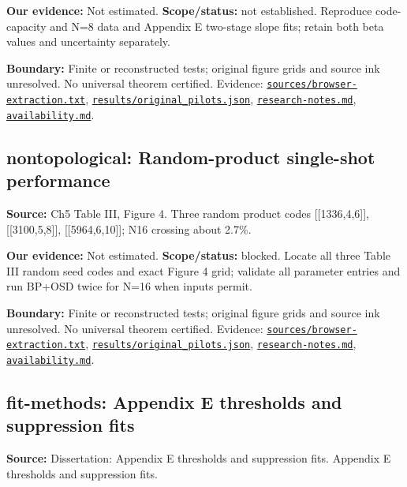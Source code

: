 \documentclass[11pt]{article}
\begin{document}
\textbf{Our evidence:} Not estimated. \textbf{Scope/status:} not established. Reproduce code-capacity and N=8 data and Appendix E two-stage slope fits; retain both beta values and uncertainty separately.

\textbf{Boundary:} Finite or reconstructed tests; original figure grids and source ink unresolved. No universal theorem certified. Evidence: \href{https://github.com/alectionary/vibe-math/blob/master/formalization/quintavalle-hgp/sources/browser-extraction.txt}{\nolinkurl{sources/browser-extraction.txt}}, \href{https://github.com/alectionary/vibe-math/blob/master/formalization/quintavalle-hgp/results/original_pilots.json}{\nolinkurl{results/original_pilots.json}}, \href{https://github.com/alectionary/vibe-math/blob/master/formalization/quintavalle-hgp/research-notes.md}{\nolinkurl{research-notes.md}}, \href{https://github.com/alectionary/vibe-math/blob/master/formalization/quintavalle-hgp/availability.md}{\nolinkurl{availability.md}}.
\subsection{nontopological: Random-product single-shot performance}
\label{claim:nontopological}
\textbf{Source:} Ch5 Table III, Figure 4. Three random product codes [[1336,4,6]], [[3100,5,8]], [[5964,6,10]]; N16 crossing about 2.7\%.

\textbf{Our evidence:} Not estimated. \textbf{Scope/status:} blocked. Locate all three Table III random seed codes and exact Figure 4 grid; validate all parameter entries and run BP+OSD twice for N=16 when inputs permit.

\textbf{Boundary:} Finite or reconstructed tests; original figure grids and source ink unresolved. No universal theorem certified. Evidence: \href{https://github.com/alectionary/vibe-math/blob/master/formalization/quintavalle-hgp/sources/browser-extraction.txt}{\nolinkurl{sources/browser-extraction.txt}}, \href{https://github.com/alectionary/vibe-math/blob/master/formalization/quintavalle-hgp/results/original_pilots.json}{\nolinkurl{results/original_pilots.json}}, \href{https://github.com/alectionary/vibe-math/blob/master/formalization/quintavalle-hgp/research-notes.md}{\nolinkurl{research-notes.md}}, \href{https://github.com/alectionary/vibe-math/blob/master/formalization/quintavalle-hgp/availability.md}{\nolinkurl{availability.md}}.
\subsection{fit-methods: Appendix E thresholds and suppression fits}
\label{claim:fit-methods}
\textbf{Source:} Dissertation: Appendix E thresholds and suppression fits. Appendix E thresholds and suppression fits.
\end{document}
